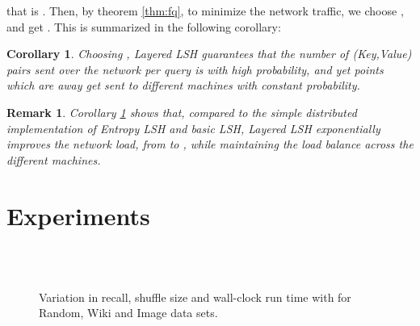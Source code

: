 \documentclass{acm_proc_article-sp}
\numberwithin{equation}{section}
\numberwithin{figure}{section}
\newtheorem{corol}[thm]{Corollary}
\newtheorem{rem}[thm]{Remark}
\begin{document}
that is . Then, by theorem \ref{thm:fq}, to minimize the network traffic, we choose , and get . This is summarized in the following corollary:

\begin{corol}
\label{cor:Dsqrtk}
Choosing , Layered LSH guarantees that the number of (Key,Value) pairs sent over the network per query is  with high probability, and yet points which are  away get sent to different machines with constant probability.
\end{corol}

\begin{rem} Corollary \ref{cor:Dsqrtk} shows that, compared to the simple distributed implementation of Entropy LSH and basic LSH, Layered LSH exponentially improves the network load, from  to , while maintaining the load balance across the different machines. 
\end{rem}


\section{Experiments}
\label{sec:exp}

\begin{figure*}[ht]
\begin{centering}
\\
\\
\caption{Variation in recall, shuffle size and wall-clock run time with  for Random, Wiki and Image data sets.}
\label{L}
\end{centering}
\end{figure*}
\end{document}
